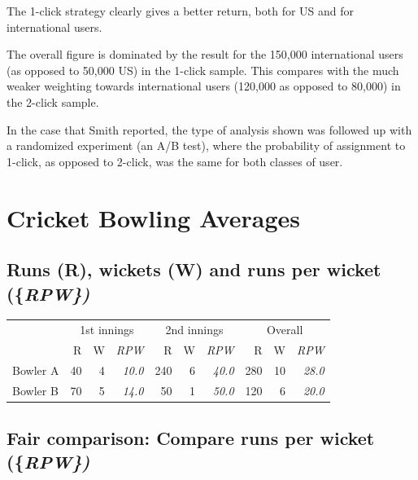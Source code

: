 \documentclass[
  10pt,
  b5paper]{book}
\begin{document}
The 1-click strategy clearly gives a better return, both for US and for international users.

The overall figure is dominated by the result for the 150,000 international users (as opposed to 50,000 US) in the 1-click sample. This compares with the much weaker weighting towards international users (120,000 as opposed to 80,000) in the 2-click sample.

In the case that Smith reported, the type of analysis shown was followed up with a randomized experiment (an A/B test), where the probability of assignment to 1-click, as opposed to 2-click, was the same for both classes of user.

\hypertarget{cricket-bowling-averages}{%
\section{Cricket Bowling Averages}\label{cricket-bowling-averages}}

\hypertarget{runs-r-wickets-w-and-runs-per-wicket}{%
\subsection*{\texorpdfstring{Runs (R), wickets (W) and runs per wicket (\{\em RPW\})}{Runs (R), wickets (W) and runs per wicket (\{\})}}\label{runs-r-wickets-w-and-runs-per-wicket}}

\vspace*{-8pt}

\begin{center}
\begin{tabular}{lrrr||rrr||rrr}
\hline
 & \multicolumn{3}{c}{1st innings} & \multicolumn{3}{c}{2nd innings} &
\multicolumn{3}{c}{Overall} \\
\cline{2-4} \cline{5-7} \cline{8-10}
& R & W & {\em RPW}   & R & W & {\em RPW} & R & W
& {\em RPW}\\
Bowler A & 40 & 4 & {\em 10.0} & 240 & 6 & {\em 40.0} & 280 & 10 &
{\em 28.0}\\
Bowler B & 70 & 5 & {\em 14.0} & 50 & 1 & {\em 50.0} & 120 & 6 & {\em 20.0} \\
\hline
\end{tabular}
\end{center}

\hypertarget{fair-comparison-compare-runs-per-wicket}{%
\subsection*{\texorpdfstring{Fair comparison: Compare runs per wicket (\{\em RPW\})}{Fair comparison: Compare runs per wicket (\{\})}}\label{fair-comparison-compare-runs-per-wicket}}
\end{document}
